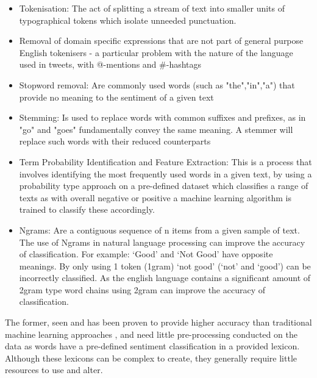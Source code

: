 \documentclass[oneside, 12pt]{article}
\begin{document}
			\begin{itemize}
				\item Tokenisation: The act of splitting a stream of text into smaller units of typographical tokens which isolate unneeded punctuation.
				\item Removal of domain specific expressions that are not part of general purpose English tokenisers - a particular problem with the nature of the language used in tweets, with @-mentions and \#-hashtags
				\item Stopword removal: Are commonly used words (such as "the","in","a") that provide no meaning to the sentiment of a given text
				\item Stemming: Is used to replace words with common suffixes and prefixes, as in "go" and "goes" fundamentally convey the same meaning. A stemmer will replace such words with their reduced counterparts
				\item Term Probability Identification and Feature Extraction: This is a process that involves identifying the most frequently used words in a given text, by using a probability type approach on a pre-defined dataset which classifies a range of texts as with overall negative or positive a machine learning algorithm is trained to classify these accordingly.
				\item Ngrams: Are a contiguous sequence of n items from a given sample of text. The use of Ngrams in natural language processing can improve the accuracy of classification. For example: ‘Good’ and ‘Not Good’ have opposite meanings. By only using 1 token (1gram) ‘not good’ (‘not’ and ‘good’) can be incorrectly classified. As the english language contains a significant amount of 2gram type word chains using 2gram can improve the accuracy of classification.
			\end{itemize}
			
			The former, seen and has been proven to provide higher accuracy than traditional machine learning approaches \cite{11}, and need little pre-processing conducted on the data as words have a pre-defined sentiment classification in a provided lexicon. Although these lexicons can be complex to create, they generally require little resources to use and alter.
			
\end{document}
